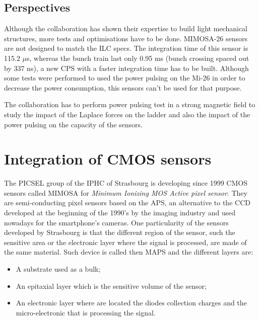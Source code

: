     \subsection{Perspectives}

    Although the collaboration has shown their expertise to build light mechanical structures, more tests and optimisations have to be done.
    MIMOSA-26 sensors are not designed to match the \gls{ILC} specs. 
    The integration time of this sensor is 115.2 $\mu$s, whereas the bunch train last only 0.95 ms (bunch crossing spaced out by 337 ns), a new CPS with a faster integration time has to be built.
    Although some tests were performed to used the power pulsing on the Mi-26 in order to decrease the power consumption, this sensors can't be used for that purpose.  

    The collaboration has to perform power pulsing test in a strong magnetic field to study the impact of the Laplace forces on the ladder and also the impact of the power pulsing on the capacity of the sensors.

  
  \section{Integration of CMOS sensors}
  \label{sec:CMOS}


  The PICSEL group of the IPHC of Strasbourg is developing since 1999 CMOS sensors called MIMOSA for \textit{Minimum Ionizing MOS Active pixel sensor}. 
  They are semi-conducting pixel sensors based on the \gls{APS}, an alternative to the \gls{CCD} developed at the beginning of the 1990's by the imaging industry and used nowadays for the smartphone's cameras.
  One particularity of the sensors developed by Strasbourg is that the different region of the sensor, such the sensitive area or the electronic layer where the signal is processed, are made of the same material.
  Such device is called then \gls{MAPS} and the different layers are:
  \begin{itemize}
    \item A substrate used as a bulk;
    \item An epitaxial layer which is the sensitive volume of the sensor;
    \item An electronic layer where are located the diodes collection charges and the micro-electronic that is processing the signal.
  \end{itemize}

